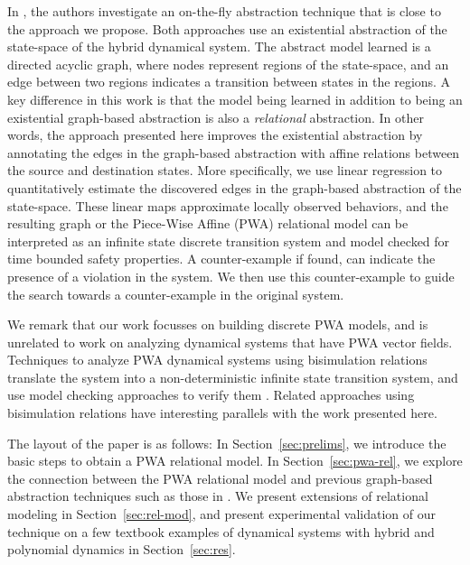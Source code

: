 In \cite{zutshi2014multiple}, the authors investigate an on-the-fly
abstraction technique that is close to the approach we propose.  Both
approaches use an existential abstraction of the state-space of the
hybrid dynamical system. The abstract model learned is a directed
acyclic graph, where nodes represent regions of the state-space, and
an edge between two regions indicates a transition between states in
the regions.  A key difference in this work is that the model being
learned in addition to being an existential graph-based abstraction is
also a {\em relational} abstraction.  In other words, the approach
presented here improves the existential abstraction by annotating the
edges in the graph-based abstraction with affine relations between the
source and destination states.  More specifically, we use linear
regression to quantitatively estimate the discovered edges in the
graph-based abstraction of the state-space. These linear maps
approximate locally observed behaviors, and the resulting graph or the
Piece-Wise Affine (PWA) relational model can be interpreted as an
infinite state discrete transition system and model checked for time
bounded safety properties. A counter-example if found, can indicate
the presence of a violation in the system.  We then use this
counter-example to guide the search towards a counter-example in the
original system. 

We remark that our work focusses on building discrete PWA models, and
is unrelated to work on analyzing dynamical systems that have PWA
vector fields. Techniques to analyze PWA dynamical systems using
bisimulation relations translate the system into a non-deterministic
infinite state transition system, and use model checking approaches to
verify them \cite{asarin2000approximate}. Related approaches using
bisimulation relations \cite{pappas2003bisimilar,tabuada2006linear,
yordanov2007model} have interesting parallels with the work presented
here.



The layout of the paper is as follows: In Section~\ref{sec:prelims},
we introduce the basic steps to obtain a PWA relational model. In
Section~\ref{sec:pwa-rel}, we explore the connection between the PWA
relational model and previous graph-based abstraction techniques such
as those in \cite{zutshi2014multiple}. We present extensions of
relational modeling in Section~\ref{sec:rel-mod}, and present
experimental validation of our technique on a few textbook examples of
dynamical systems with hybrid and polynomial dynamics in
Section~\ref{sec:res}.
